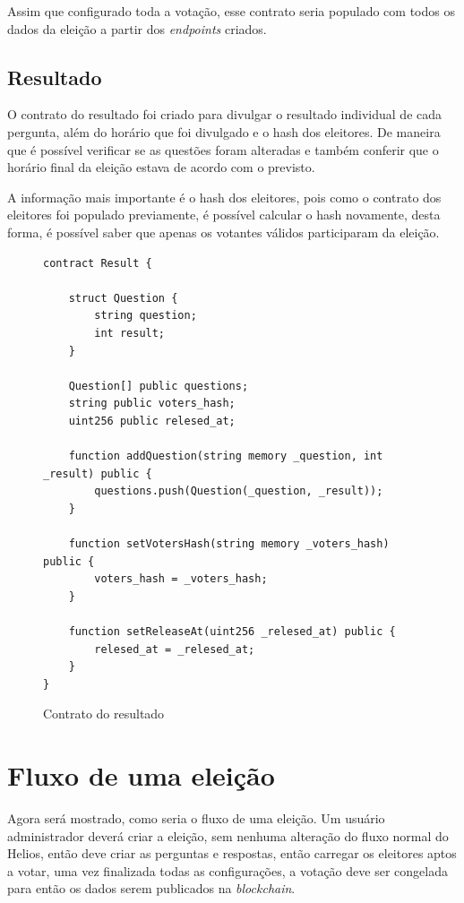 \documentclass{ufsctex/ufsctex}
\begin{document}
Assim que configurado toda a votação, esse contrato seria populado com todos os
dados da eleição a partir dos \textit{endpoints} criados.

\subsection{Resultado}

O contrato do resultado foi criado para divulgar o resultado individual de cada
pergunta, além do horário que foi divulgado e o hash dos eleitores. De maneira
que é possível verificar se as questões foram alteradas e também conferir que o
horário final da eleição estava de acordo com o previsto.

A informação mais importante é o hash dos eleitores, pois como o contrato dos
eleitores foi populado previamente, é possível calcular o hash novamente, desta
forma, é possível saber que apenas os votantes válidos participaram da eleição.

\begin{figure}[H]
\centering
\begin{lstlisting}[language=Solidity]
contract Result {
    
    struct Question {
        string question;
        int result;
    }
    
    Question[] public questions;
    string public voters_hash;
    uint256 public relesed_at;
    
    function addQuestion(string memory _question, int _result) public {
        questions.push(Question(_question, _result));
    }
    
    function setVotersHash(string memory _voters_hash) public {
        voters_hash = _voters_hash;
    }
    
    function setReleaseAt(uint256 _relesed_at) public {
        relesed_at = _relesed_at;
    }
}
\end{lstlisting}
	\caption{Contrato do resultado}
\end{figure}

\section{Fluxo de uma eleição}

Agora será mostrado, como seria o fluxo de uma eleição. Um usuário
administrador deverá criar a eleição, sem nenhuma alteração do fluxo normal do
Helios, então deve criar as perguntas e respostas, então carregar os eleitores
aptos a votar, uma vez finalizada todas as configurações, a votação deve ser
congelada para então os dados serem publicados na \textit{blockchain}.
\end{document}
